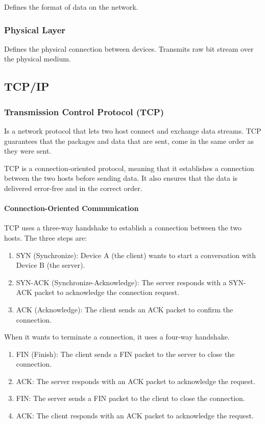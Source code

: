 \documentclass[a4paper]{article}
\begin{document}
    Defines the format of data on the network. 

    \subsubsection{Physical Layer}

    Defines the physical connection between devices. Transmits raw bit stream over the physical medium.


    \subsection{TCP/IP}
    \subsubsection{Transmission Control Protocol (TCP)} Is a network protocol that lets two host connect and exchange data streams. TCP guarantees that the packages and data that are sent, come in the same order as they were sent. 

    TCP is a connection-oriented protocol, meaning that it establishes a connection between the two hosts before sending data. It also ensures that the data is delivered error-free and in the correct order.

    \paragraph{Connection-Oriented Communication} TCP uses a three-way handshake to establish a connection between the two hosts. The three steps are:

    \begin{enumerate}
        \item SYN (Synchronize): Device A (the client) wants to start a conversation with Device B (the server).
        \item SYN-ACK (Synchronize-Acknowledge): The server responds with a SYN-ACK packet to acknowledge the connection request.
        \item ACK (Acknowledge): The client sends an ACK packet to confirm the connection.
    \end{enumerate}

    When it wants to terminate a connection, it uses a four-way handshake.

    \begin{enumerate}
        \item FIN (Finish): The client sends a FIN packet to the server to close the connection.
        \item ACK: The server responds with an ACK packet to acknowledge the request.
        \item FIN: The server sends a FIN packet to the client to close the connection.
        \item ACK: The client responds with an ACK packet to acknowledge the request.
    \end{enumerate}
\end{document}
